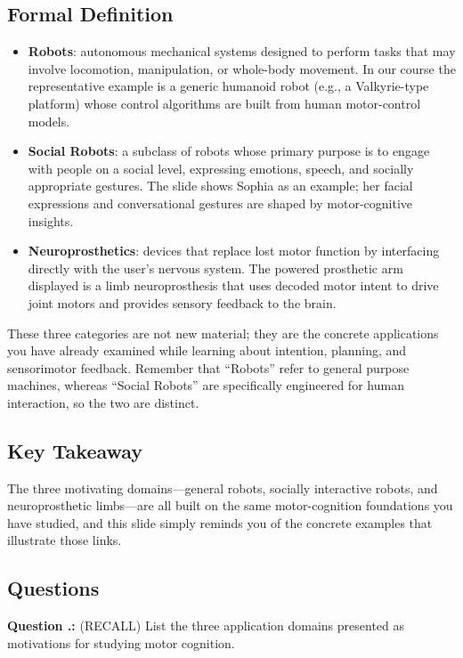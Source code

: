 \documentclass[12pt, a4paper]{article}
\newcounter{question}[section]
\renewcommand{\thequestion}{\thesection.\arabic{question}}
\newenvironment{question}
  {\refstepcounter{question}\par\noindent\textbf{Question \thequestion:}}
  {\par}
\begin{document}
\subsection{Formal Definition}
\begin{itemize}
  \item \textbf{Robots}: autonomous mechanical systems designed to perform tasks that may involve locomotion, manipulation, or whole-body movement.  In our course the representative example is a generic humanoid robot (e.g., a Valkyrie-type platform) whose control algorithms are built from human motor-control models.
  \item \textbf{Social Robots}: a subclass of robots whose primary purpose is to engage with people on a social level, expressing emotions, speech, and socially appropriate gestures.  The slide shows Sophia as an example; her facial expressions and conversational gestures are shaped by motor-cognitive insights.
  \item \textbf{Neuroprosthetics}: devices that replace lost motor function by interfacing directly with the user's nervous system.  The powered prosthetic arm displayed is a limb neuroprosthesis that uses decoded motor intent to drive joint motors and provides sensory feedback to the brain.
\end{itemize}
These three categories are not new material; they are the concrete applications you have already examined while learning about intention, planning, and sensorimotor feedback.  Remember that ``Robots'' refer to general purpose machines, whereas ``Social Robots'' are specifically engineered for human interaction, so the two are distinct.

\subsection{Key Takeaway}
The three motivating domains---general robots, socially interactive robots, and neuroprosthetic limbs---are all built on the same motor-cognition foundations you have studied, and this slide simply reminds you of the concrete examples that illustrate those links.

\newpage
\subsection*{Questions}

\begin{question}
(RECALL) List the three application domains presented as motivations for studying motor cognition.
\end{question}
\end{document}
